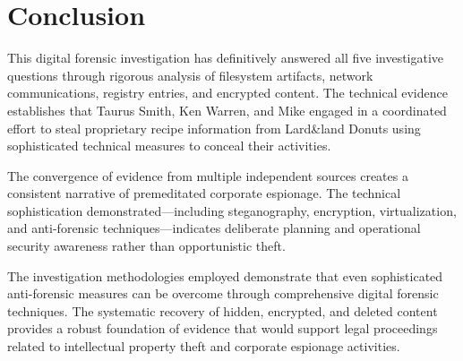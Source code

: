 \section{Conclusion}
This digital forensic investigation has definitively answered all five investigative questions through rigorous analysis of filesystem artifacts, network communications, registry entries, and encrypted content. The technical evidence establishes that Taurus Smith, Ken Warren, and Mike engaged in a coordinated effort to steal proprietary recipe information from Lard\&land Donuts using sophisticated technical measures to conceal their activities.

The convergence of evidence from multiple independent sources creates a consistent narrative of premeditated corporate espionage. The technical sophistication demonstrated—including steganography, encryption, virtualization, and anti-forensic techniques—indicates deliberate planning and operational security awareness rather than opportunistic theft.

The investigation methodologies employed demonstrate that even sophisticated anti-forensic measures can be overcome through comprehensive digital forensic techniques. The systematic recovery of hidden, encrypted, and deleted content provides a robust foundation of evidence that would support legal proceedings related to intellectual property theft and corporate espionage activities.